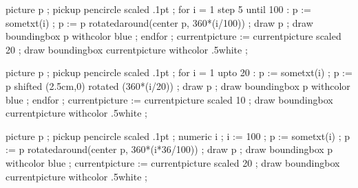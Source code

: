 \startTeXtexts
\stopTeXtexts

\startMPpage
    picture p ; pickup pencircle scaled .1pt ;
    for i = 1 step 5 until 100 :
        p := sometxt(i) ;
        p := p rotatedaround(center p,  360*(i/100)) ;
        draw p ; draw boundingbox p withcolor blue ;
    endfor ;
    currentpicture := currentpicture scaled 20 ;
    draw boundingbox currentpicture  withcolor .5white ;
\stopMPpage

\startTeXtexts
\stopTeXtexts

\startMPpage
    picture p ; pickup pencircle scaled .1pt ;
    for i = 1 upto 20 :
        p := sometxt(i) ;
        p := p shifted (2.5cm,0) rotated (360*(i/20)) ;
        draw p ; draw boundingbox p withcolor blue  ;
    endfor ;
    currentpicture := currentpicture scaled 10 ;
    draw boundingbox currentpicture  withcolor .5white ;
\stopMPpage

\startTeXtexts
\stopTeXtexts

\startMPpage
    picture p ; pickup pencircle scaled .1pt ;
    numeric i ; i := 100 ;
    p := sometxt(i) ;
    p := p rotatedaround(center p,  360*(i*36/100)) ;
    draw p ; draw boundingbox p withcolor blue  ;
    currentpicture := currentpicture scaled 20 ;
    draw boundingbox currentpicture  withcolor .5white ;
\stopMPpage

